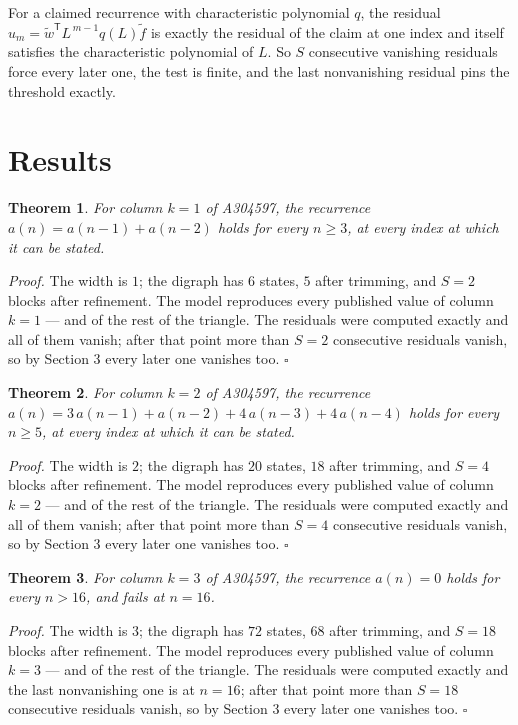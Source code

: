 \documentclass[11pt]{article}
\newtheorem{theorem}{Theorem}
\theoremstyle{definition}
\begin{document}
For a claimed recurrence with characteristic polynomial $q$, the residual $u_m = \tilde w^{\mathsf T}L^{\,m-1}q(L)\tilde f$ is exactly the residual of the claim at one index and itself satisfies the characteristic polynomial of $L$. So $S$ consecutive vanishing residuals force every later one, the test is finite, and the last nonvanishing residual pins the threshold exactly.

\section{Results}

\begin{theorem} For column $k = 1$ of A304597, the recurrence $a(n) = a(n-1) + a(n-2)$ holds for every $n \ge 3$, at every index at which it can be stated.\end{theorem}

{\itshape Proof.} The width is $1$; the digraph has $6$ states, $5$ after trimming, and $S = 2$ blocks after refinement. The model reproduces every published value of column $k = 1$ --- and of the rest of the triangle. The residuals were computed exactly and all of them vanish; after that point more than $S = 2$ consecutive residuals vanish, so by Section 3 every later one vanishes too. $\square$

\begin{theorem} For column $k = 2$ of A304597, the recurrence $a(n) = 3\,a(n-1) + a(n-2) + 4\,a(n-3) + 4\,a(n-4)$ holds for every $n \ge 5$, at every index at which it can be stated.\end{theorem}

{\itshape Proof.} The width is $2$; the digraph has $20$ states, $18$ after trimming, and $S = 4$ blocks after refinement. The model reproduces every published value of column $k = 2$ --- and of the rest of the triangle. The residuals were computed exactly and all of them vanish; after that point more than $S = 4$ consecutive residuals vanish, so by Section 3 every later one vanishes too. $\square$

\begin{theorem} For column $k = 3$ of A304597, the recurrence $a(n) = 0$ holds for every $n > 16$, and fails at $n = 16$.\end{theorem}

{\itshape Proof.} The width is $3$; the digraph has $72$ states, $68$ after trimming, and $S = 18$ blocks after refinement. The model reproduces every published value of column $k = 3$ --- and of the rest of the triangle. The residuals were computed exactly and the last nonvanishing one is at $n = 16$; after that point more than $S = 18$ consecutive residuals vanish, so by Section 3 every later one vanishes too. $\square$
\end{document}
